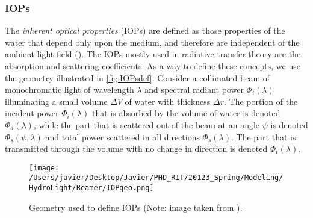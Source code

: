 \subsubsection*{IOPs}
The {\it inherent optical properties} (IOPs) are defined as those properties of the water that depend only upon the medium, and therefore are independent of the ambient light field (\cite{Mobley:2001}). The IOPs mostly used in radiative transfer theory are the absorption and scattering coefficients. As a way to define these concepts, we use the geometry illustrated in \autoref{fig:IOPsdef}. Consider a collimated beam of monochromatic light of wavelength $\lambda$ and spectral radiant power $\Phi_i(\lambda)$ illuminating a small volume $\Delta V$ of water with thickness $\Delta r$. The portion of the incident power $\Phi_i(\lambda)$ that is absorbed by the volume of water is denoted $\Phi_a(\lambda)$, while the part that is scattered out of the beam at an angle $\psi$ is denoted $\Phi_s(\psi,\lambda)$ and total power scattered in all directions $\Phi_s(\lambda)$. The part that is transmitted through the volume with no change in direction is denoted $\Phi_t(\lambda)$. 

\begin{figure}[htb]
\centering
\texttt{[image: /Users/javier/Desktop/Javier/PHD\_RIT/20123\_Spring/Modeling/HydroLight/Beamer/IOPgeo.png]}
\caption{Geometry used to define IOPs (Note: image taken from \cite{Mobley:2001}). \label{fig:IOPsdef} } 
\end{figure}

